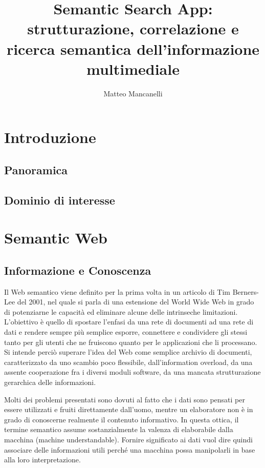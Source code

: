 \documentclass[Lau,binding=0.6cm,noexaminfo,oneside]{sapthesis}
\title{Semantic Search App: strutturazione, correlazione e ricerca semantica dell'informazione multimediale}
\author{Matteo Mancanelli}
\begin{document}
\frontmatter
\maketitle
\dedication{Dedicato a\\ Morten Tyldum}


\tableofcontents

\mainmatter
\chapter{Introduzione}
\section{Panoramica}
\section{Dominio di interesse}

\chapter{Semantic Web}
\section{Informazione e Conoscenza}

Il Web semantico viene definito per la prima volta in un articolo di Tim Berners-Lee del 2001, nel quale si parla di una estensione del World Wide Web in grado di potenziarne le capacità ed eliminare alcune delle intrinseche limitazioni.
L'obiettivo è quello di spostare l'enfasi da una rete di documenti ad una rete di dati e rendere sempre più semplice esporre, connettere e condividere gli stessi tanto per gli utenti che ne fruiscono quanto per le applicazioni che li processano.
Si intende perciò superare l'idea del Web come semplice archivio di documenti, caratterizzato da uno scambio poco flessibile, dall'information overload, da una assente cooperazione fra i diversi moduli software, da una mancata strutturazione gerarchica delle informazioni.\medskip

Molti dei problemi presentati sono dovuti al fatto che i dati sono pensati per essere utilizzati e fruiti direttamente dall'uomo, mentre un elaboratore non è in grado di conoscerne realmente il contenuto informativo. In questa ottica, il termine semantico assume sostanzialmente la valenza di elaborabile dalla macchina (machine understandable).
Fornire significato ai dati vuol dire quindi associare delle informazioni utili perché una macchina possa manipolarli in base alla loro interpretazione.\medskip
\end{document}

